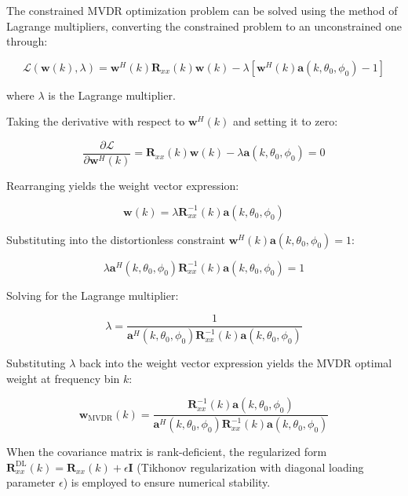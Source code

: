 \documentclass[journal]{IEEEtran}
\begin{document}
The constrained MVDR optimization problem can be solved using the method of Lagrange multipliers, converting the constrained problem to an unconstrained one through:

\begin{equation}
\mathcal{L}(\boldsymbol{w}(k), \lambda) = \boldsymbol{w}^H(k) \boldsymbol{R}_{xx}(k) \boldsymbol{w}(k) - \lambda \left[ \boldsymbol{w}^H(k)\boldsymbol{a}(k, \theta_0, \phi_0) - 1 \right]
\end{equation}

where $\lambda$ is the Lagrange multiplier.

Taking the derivative with respect to $\boldsymbol{w}^H(k)$ and setting it to zero:

\begin{equation}
\frac{\partial \mathcal{L}}{\partial \boldsymbol{w}^H(k)} = \boldsymbol{R}_{xx}(k) \boldsymbol{w}(k) - \lambda \boldsymbol{a}(k, \theta_0, \phi_0) = 0
\end{equation}

Rearranging yields the weight vector expression:

\begin{equation}
\boldsymbol{w}(k) = \lambda \boldsymbol{R}_{xx}^{-1}(k)\boldsymbol{a}(k, \theta_0, \phi_0)
\end{equation}

Substituting into the distortionless constraint $\boldsymbol{w}^H(k)\boldsymbol{a}(k, \theta_0, \phi_0) = 1$:

\begin{equation}
\lambda \boldsymbol{a}^H(k, \theta_0, \phi_0) \boldsymbol{R}_{xx}^{-1}(k)\boldsymbol{a}(k, \theta_0, \phi_0) = 1
\end{equation}

Solving for the Lagrange multiplier:

\begin{equation}
\lambda = \frac{1}{\boldsymbol{a}^H(k, \theta_0, \phi_0) \boldsymbol{R}_{xx}^{-1}(k)\boldsymbol{a}(k, \theta_0, \phi_0)}
\end{equation}

Substituting $\lambda$ back into the weight vector expression yields the MVDR optimal weight at frequency bin $k$:

\begin{equation}
\boldsymbol{w}_{\text{MVDR}}(k) = \frac{\boldsymbol{R}_{xx}^{-1}(k)\boldsymbol{a}(k, \theta_0, \phi_0)}{\boldsymbol{a}^H(k, \theta_0, \phi_0)\boldsymbol{R}_{xx}^{-1}(k)\boldsymbol{a}(k, \theta_0, \phi_0)}
\end{equation}

When the covariance matrix is rank-deficient, the regularized form $\boldsymbol{R}_{xx}^{\text{DL}}(k) = \boldsymbol{R}_{xx}(k) + \epsilon \mathbf{I}$ (Tikhonov regularization with diagonal loading parameter $\epsilon$) is employed to ensure numerical stability.



\end{document}
